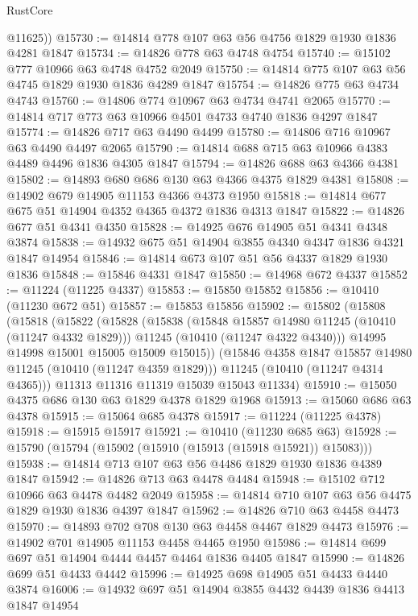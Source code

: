 \begin{lexlean}{RustCore}
\begin{coremodule}
        @11625))
@15730 := @14814 @778 @107 @63 @56 @4756 @1829 @1930 @1836 @4281 @1847
@15734 := @14826 @778 @63 @4748 @4754
@15740 := @15102 @777 @10966 @63 @4748 @4752 @2049
@15750 := @14814 @775 @107 @63 @56 @4745 @1829 @1930 @1836 @4289 @1847
@15754 := @14826 @775 @63 @4734 @4743
@15760 := @14806 @774 @10967 @63 @4734 @4741 @2065
@15770 := @14814 @717 @773 @63 @10966 @4501 @4733 @4740 @1836 @4297 @1847
@15774 := @14826 @717 @63 @4490 @4499
@15780 := @14806 @716 @10967 @63 @4490 @4497 @2065
@15790 := @14814 @688 @715 @63 @10966 @4383 @4489 @4496 @1836 @4305 @1847
@15794 := @14826 @688 @63 @4366 @4381
@15802 := @14893 @680 @686 @130 @63 @4366 @4375 @1829 @4381
@15808 := @14902 @679 @14905 @11153 @4366 @4373 @1950
@15818 := @14814 @677 @675 @51 @14904 @4352 @4365 @4372 @1836 @4313 @1847
@15822 := @14826 @677 @51 @4341 @4350
@15828 := @14925 @676 @14905 @51 @4341 @4348 @3874
@15838 := @14932 @675 @51 @14904 @3855 @4340 @4347 @1836 @4321 @1847 @14954
@15846 := @14814 @673 @107 @51 @56 @4337 @1829 @1930 @1836
@15848 := @15846 @4331 @1847
@15850 := @14968 @672 @4337
@15852 := @11224 (@11225 @4337)
@15853 := @15850 @15852
@15856 := @10410 (@11230 @672 @51)
@15857 := @15853 @15856
@15902 := @15802
    (@15808
      (@15818
        (@15822
          (@15828
            (@15838
              (@15848 @15857 @14980 @11245 (@10410 (@11247 @4332 @1829)))
              @11245
              (@10410 (@11247 @4322 @4340)))
            @14995
            @14998
            @15001
            @15005
            @15009
            @15015))
        (@15846 @4358 @1847 @15857 @14980 @11245 (@10410 (@11247 @4359 @1829)))
        @11245
        (@10410 (@11247 @4314 @4365)))
      @11313
      @11316
      @11319
      @15039
      @15043
      @11334)
@15910 := @15050 @4375 @686 @130 @63 @1829 @4378 @1829 @1968
@15913 := @15060 @686 @63 @4378
@15915 := @15064 @685 @4378
@15917 := @11224 (@11225 @4378)
@15918 := @15915 @15917
@15921 := @10410 (@11230 @685 @63)
@15928 := @15790 (@15794 (@15902 (@15910 (@15913 (@15918 @15921)) @15083)))
@15938 := @14814 @713 @107 @63 @56 @4486 @1829 @1930 @1836 @4389 @1847
@15942 := @14826 @713 @63 @4478 @4484
@15948 := @15102 @712 @10966 @63 @4478 @4482 @2049
@15958 := @14814 @710 @107 @63 @56 @4475 @1829 @1930 @1836 @4397 @1847
@15962 := @14826 @710 @63 @4458 @4473
@15970 := @14893 @702 @708 @130 @63 @4458 @4467 @1829 @4473
@15976 := @14902 @701 @14905 @11153 @4458 @4465 @1950
@15986 := @14814 @699 @697 @51 @14904 @4444 @4457 @4464 @1836 @4405 @1847
@15990 := @14826 @699 @51 @4433 @4442
@15996 := @14925 @698 @14905 @51 @4433 @4440 @3874
@16006 := @14932 @697 @51 @14904 @3855 @4432 @4439 @1836 @4413 @1847 @14954

\end{coremodule}
\end{lexlean}
